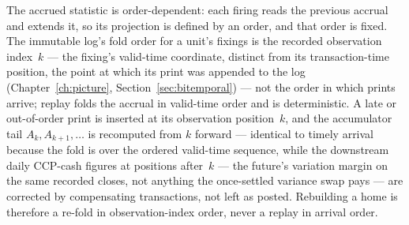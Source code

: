 The accrued statistic is order-dependent: each firing reads the previous accrual and
extends it, so its projection is defined by an order, and that order is fixed. The
immutable log's fold order for a unit's fixings is the recorded observation index~$k$ ---
the fixing's valid-time coordinate, distinct from its transaction-time position, the point
at which its print was appended to the log (Chapter~\ref{ch:picture},
Section~\ref{sec:bitemporal}) --- not the order in which prints arrive; replay folds the
accrual in valid-time order and is deterministic. A late or out-of-order print is inserted
at its observation position~$k$, and the accumulator tail $A_{k},A_{k+1},\dots$ is
recomputed from $k$ forward --- identical to timely arrival because the fold is over the
ordered valid-time sequence,
while the downstream daily CCP-cash figures at positions after~$k$ --- the future's
variation margin on the same recorded closes, not anything the once-settled variance swap
pays --- are corrected by compensating transactions, not left as posted. Rebuilding a home is therefore a re-fold in
observation-index order, never a replay in arrival order.
